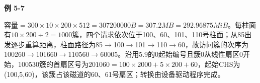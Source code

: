 {\color{ink}\bfseries 例 5-7}\par\vspace{1bp}容量\(=\allowbreak{}300\times 10\times 200\times 512=\allowbreak{}307200000 B=\allowbreak{}307.2 MB=\allowbreak{}292.96875 MiB\)。每柱面有\(10\times 200\div 2=\allowbreak{}1000\)簇，四个请求依次位于100、60、101、110号柱面；从85出发逐步重算距离，柱面路径为85\(\to \)100\(\to \)101\(\to \)110\(\to \)60，故访问簇的次序为100260\(\to \)101660\(\to \)110560\(\to \)60005。沿用5.9的0起始编号且簇0从线性扇区0开始，100530簇的首扇区号为\(201060=\allowbreak{}100\times 2000+\allowbreak{}5\times 200+\allowbreak{}60\)，起始CHS为(100,\allowbreak{}5,\allowbreak{}60)，该簇占该磁道的60、61号扇区；转换由设备驱动程序完成。
